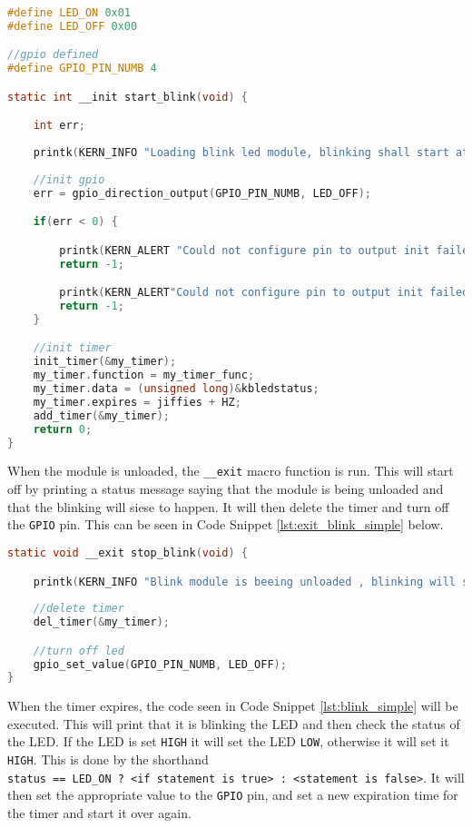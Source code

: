 \documentclass[a4paper,oneside,onecolumn]{article}
\newcommand{\code}[1]{\colorbox{codegray}{\texttt{#1}}}
\begin{document}
\begin{lstlisting}[language=c, label={lst:init_blink_simple}, caption={Initialisation Function}]
#define LED_ON 0x01
#define LED_OFF 0x00

//gpio defined
#define GPIO_PIN_NUMB 4

static int __init start_blink(void) {

    int err;
    
    printk(KERN_INFO "Loading blink led module, blinking shall start at a rate of 1 second.\n");
    
    //init gpio
    err = gpio_direction_output(GPIO_PIN_NUMB, LED_OFF);

    if(err < 0) {

        printk(KERN_ALERT "Could not configure pin to output init failed");
        return -1;

        printk(KERN_ALERT"Could not configure pin to output init failed");
        return -1;
    }

    //init timer
    init_timer(&my_timer);
    my_timer.function = my_timer_func;
    my_timer.data = (unsigned long)&kbledstatus;
    my_timer.expires = jiffies + HZ;
    add_timer(&my_timer);
    return 0;
}
\end{lstlisting}

When the module is unloaded, the \code{\_\_exit} macro function is run. This will start off by printing a status message saying that the module is being unloaded and that the blinking will siese to happen. It will then delete the timer and turn off the \texttt{GPIO} pin. This can be seen in Code Snippet \ref{lst:exit_blink_simple} below. 

\begin{lstlisting}[language=c, label={lst:exit_blink_simple}, caption={Initialisation Function}]
static void __exit stop_blink(void) {

    printk(KERN_INFO "Blink module is beeing unloaded , blinking will stop\n");
    
    //delete timer
    del_timer(&my_timer);

    //turn off led
    gpio_set_value(GPIO_PIN_NUMB, LED_OFF);
}
\end{lstlisting}

When the timer expires, the code seen in Code Snippet \ref{lst:blink_simple} will be executed. This will print that it is blinking the LED and then check the status of the LED. If the LED is set \texttt{HIGH} it will set the LED \texttt{LOW}, otherwise it will set it \texttt{HIGH}. This is done by the shorthand \\ \code{status == LED\_ON ? <if statement is true> : <statement is false>}. It will then set the appropriate value to the \texttt{GPIO} pin, and set a new expiration time for the timer and start it over again.
\end{document}
